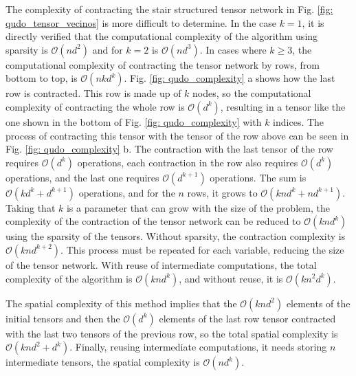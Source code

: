 \documentclass[%
 reprint,
 amsmath,amssymb,
 aps,
 pra,showkeys,
]{revtex4-2}
\begin{document}
The complexity of contracting the stair structured tensor network in Fig. \ref{fig: qudo_tensor_vecinos} is more difficult to determine. In the case $k=1$, it is directly verified that the computational complexity of the algorithm using sparsity is $\mathcal{O}(nd^{2})$ and for $k=2$ is $\mathcal{O}(nd^{3})$. In cases where $k \geq 3$, the computational complexity of contracting the tensor network by rows, from bottom to top, is $\mathcal{O}(nkd^{k})$. Fig. \ref{fig: qudo_complexity} a shows how the last row is contracted. This row is made up of $k$ nodes, so the computational complexity of contracting the whole row is $\mathcal{O}(d^{k})$, resulting in a tensor like the one shown in the bottom of Fig. \ref{fig: qudo_complexity} with $k$ indices. The process of contracting this tensor with the tensor of the row above can be seen in Fig. \ref{fig: qudo_complexity} b. The contraction with the last tensor of the row requires $\mathcal{O}(d^{k})$ operations, each contraction in the row also requires $\mathcal{O}(d^{k})$ operations, and the last one requires $\mathcal{O}(d^{k+1})$ operations. The sum is $\mathcal{O}(kd^{k}+d^{k+1})$ operations, and for the $n$ rows, it grows to $\mathcal{O}(knd^{k}+nd^{k+1})$. Taking that $k$ is a parameter that can grow with the size of the problem, the complexity of the contraction of the tensor network can be reduced to $\mathcal{O}(knd^{k})$ using the sparsity of the tensors. Without sparsity, the contraction complexity is $\mathcal{O}(knd^{k+2})$. This process must be repeated for each variable, reducing the size of the tensor network. With reuse of intermediate computations, the total complexity of the algorithm is $\mathcal{O}(knd^{k})$, and without reuse, it is $\mathcal{O}(kn^2d^{k})$.


The spatial complexity of this method implies that the $\mathcal{O}(knd^2)$ elements of the initial tensors and then the $\mathcal{O}(d^{k})$ elements of the last row tensor contracted with the last two tensors of the previous row, so the total spatial complexity is $\mathcal{O}\left(knd^2+d^{k}\right)$. Finally, reusing intermediate computations, it needs storing $n$ intermediate tensors, the spatial complexity is $\mathcal{O}(nd^{k})$.
\end{document}
